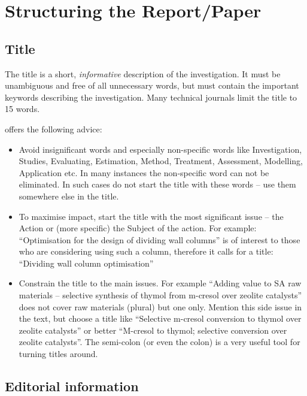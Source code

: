 \documentclass[a5paper, 10pt]{article}
\begin{document}
\section{Structuring the Report/Paper}
\label{cha:structure}

\subsection{Title}
\label{sec:title}
The title is a short, \emph{informative} description of the
investigation.  It must be unambiguous and free of all unnecessary
words, but must contain the important keywords describing the
investigation. Many technical journals limit the title to 15 words.

\citet{mandersloot} offers the following advice:
\begin{itemize}
\item Avoid insignificant words and especially non-specific words like
  Investigation, Studies, Evaluating, Estimation, Method, Treatment,
  Assessment, Modelling, Application etc. In many instances the
  non-specific word can not be eliminated. In such cases do not start
  the title with these words -- use them somewhere else in the title.

\item To maximise impact, start the title with the most significant
  issue -- the Action or (more specific) the Subject of the action.
  For example: ``Optimisation for the design of dividing wall columns''
  is of interest to those who are considering using such a column,
  therefore it calls for a title: ``Dividing wall column optimisation''

\item Constrain the title to the main issues. For example ``Adding
  value to SA raw materials -- selective synthesis of thymol from
  m-cresol over zeolite catalysts'' does not cover raw materials
  (plural) but one only. Mention this side issue in the text, but
  choose a title like ``Selective m-cresol conversion to thymol over
  zeolite catalysts'' or better ``M-cresol to thymol; selective
  conversion over zeolite catalysts''.  The semi-colon (or even the
  colon) is a very useful tool for turning titles around.
\end{itemize}

\subsection{Editorial information}
\end{document}
